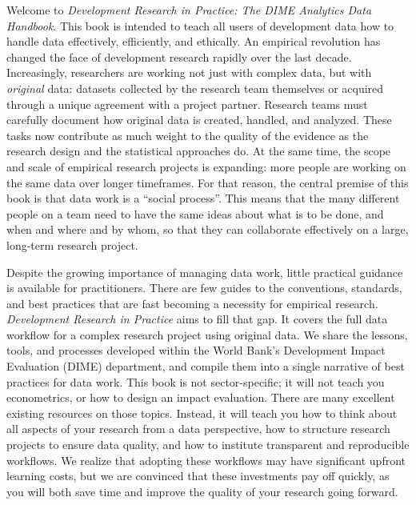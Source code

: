 \begin{fullwidth}
Welcome to \textit{Development Research in Practice: The DIME Analytics Data Handbook}.
This book is intended to teach all users of development data
how to handle data effectively, efficiently, and ethically.
An empirical revolution has changed the face of development research rapidly over the last decade.
Increasingly, researchers are working not just with complex data,
but with \textit{original} data:
datasets collected by the research team themselves
or acquired through a unique agreement with a project partner.
Research teams must carefully document how original data is created, handled, and analyzed.
These tasks now contribute as much weight to the quality of the evidence
as the research design and the statistical approaches do.
At the same time, the scope and scale of empirical research projects is expanding:
more people are working on the same data over longer timeframes.
For that reason, the central premise of this book is that data work is a ``social process''.
This means that the many different people on a team need to have the same ideas
about what is to be done, and when and where and by whom,
so that they can collaborate effectively on a large, long-term research project.

Despite the growing importance of managing data work,
little practical guidance is available for practitioners.
There are few guides to the conventions, standards, and best practices
that are fast becoming a necessity for empirical research.
\textit{Development Research in Practice} aims to fill that gap.
It covers the full data workflow for a complex research project using original data.
We share the lessons, tools, and processes
developed within the World Bank's Development Impact Evaluation (DIME) department,
and compile them into a single narrative of best practices for data work.
This book is not sector-specific;
it will not teach you econometrics,
or how to design an impact evaluation.
There are many excellent existing resources on those topics.
Instead, it will teach you how to think about all aspects of your research from a data perspective,
how to structure research projects to ensure data quality,
and how to institute transparent and reproducible workflows.
We realize that adopting these workflows may have significant upfront learning costs, 
but we are convinced that these investments pay off quickly, 
as you will both save time and improve the quality of your research going forward.


\end{fullwidth}

